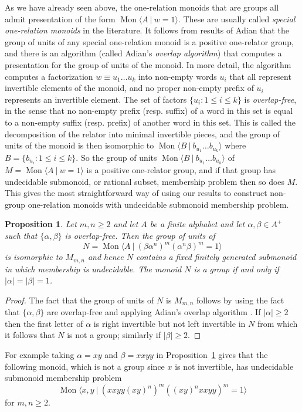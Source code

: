 \documentclass{amsart}
\newcommand{\Mpres}[2]{\operatorname{Mon}\bigl\langle #1\:|\:#2 \bigr\rangle}
\theoremstyle{plain}
\newtheorem{prop}[theorem]{Proposition}
\theoremstyle{definition}
\begin{document}
As we have already seen above, the one-relation monoids that are groups all admit presentation of the form $\Mpres{A}{w=1}$. These are usually called \emph{special one-relation monoids} in the literature. It follows from results of Adian \cite{Adian1966} that the group of units of any special one-relation monoid is a positive one-relator group, and there is an algorithm (called Adian's \textit{overlap algorithm}) that computes a presentation for the group of units of the monoid. In more detail, the algorithm computes a factorization $w \equiv u_1 \ldots u_k$ into non-empty words $u_i$ that all represent invertible elements of the monoid, and no proper non-empty prefix of $u_i$ represents an invertible element. The set of factors $\{u_i : 1 \leq i \leq k\}$ is \textit{overlap-free}, in the sense that no non-empty prefix (resp. suffix) of a word in this set is equal to a non-empty suffix (resp. prefix) of another word in this set.  This is called the decomposition of the relator into minimal invertible pieces, and the group of units of the monoid is then isomorphic to $\Mpres{B}{b_{u_1} \ldots b_{u_k}}$ where $B = \{ b_{u_i} : 1 \leq i \leq k \}$.  So the group of units $\Mpres{B}{b_{u_1} \ldots b_{u_k}}$ of $M=\Mpres{A}{w=1}$ is a positive one-relator group, and if that group has undecidable submonoid, or rational subset, membership problem then so does $M$.  This gives the most straightforward way of using our results to construct non-group one-relation monoids with undecidable submonoid membership problem.   
\begin{prop}\label{prop_specialmonoidexamples} 
Let $m, n \geq 2$ and let $A$ be a finite alphabet and let $\alpha, \beta \in A^+$ such that $\{\alpha,\beta\}$ is overlap-free.  
Then the group of units of 
\[
N = \Mpres{A}{(\beta \alpha^n)^m(\alpha^n \beta)^m = 1}
\]
is isomorphic to 
$M_{m,n}$
and hence 
$N$  contains a fixed finitely generated submonoid in which membership is undecidable. The monoid $N$ is a group if and only if $|\alpha| = |\beta| = 1$.  
\end{prop}
\begin{proof} 
The fact that the group of units of $N$ is $M_{m,n}$ follows by using the fact that $\{\alpha,\beta\}$ are overlap-free and applying Adian's overlap algorithm \cite{Adian1966}. If $|\alpha| \geq 2$ then the first letter of $\alpha$ is right invertible but not left invertible in $N$ from which it follows that $N$ is not a group; similarly if $|\beta| \geq 2$.      
\end{proof}
For example taking $\alpha = xy$ and $\beta = xxyy$ in 
Proposition~\ref{prop_specialmonoidexamples}
gives that the following monoid, which is not a group since $x$ is not invertible, has undecidable submonoid membership problem  
\[
\Mpres{x, y}{(xxyy (xy)^n)^m((xy)^n xxyy)^m = 1}
\]
for $m,n \geq 2$.    
\end{document}
